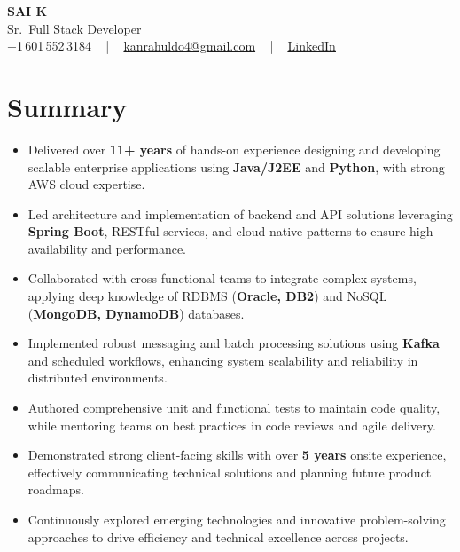 \documentclass[letterpaper,11pt]{article}
\newcommand{\resumeItem}[1]{
  \item\footnotesize{
    {#1 \vspace{-2pt}}
  }
}
\newcommand{\resumeItemListStart}{\begin{itemize}[leftmargin=*]}
\newcommand{\resumeItemListEnd}{\end{itemize}\vspace{-5pt}}
\begin{document}
\begin{center}
    {\fontsize{14pt}{12pt}\selectfont \textbf{\MakeUppercase{Sai K}}}\\ \vspace{2pt}
    \fontsize{10pt}{12pt}\selectfont Sr.\ Full Stack Developer\\ \vspace{2pt}
    \fontsize{10pt}{12pt}\selectfont +1\,601\,552\,3184 ~ | ~
    \href{mailto:kanrahuldo4@gmail.com}{kanrahuldo4@gmail.com} ~ | ~
    \href{https://www.linkedin.com/in/srrrk/}{\color{blue}\underline{LinkedIn}}
    \vspace{-10pt}
\end{center}

\section{Summary}
\fontsize{9pt}{10pt}\selectfont
\resumeItemListStart
  \resumeItem{Delivered over \textbf{11+ years} of hands-on experience designing and developing scalable enterprise applications using \textbf{Java/J2EE} and \textbf{Python}, with strong AWS cloud expertise.}
  \resumeItem{Led architecture and implementation of backend and API solutions leveraging \textbf{Spring Boot}, RESTful services, and cloud-native patterns to ensure high availability and performance.}
  \resumeItem{Collaborated with cross-functional teams to integrate complex systems, applying deep knowledge of RDBMS (\textbf{Oracle, DB2}) and NoSQL (\textbf{MongoDB, DynamoDB}) databases.}
  \resumeItem{Implemented robust messaging and batch processing solutions using \textbf{Kafka} and scheduled workflows, enhancing system scalability and reliability in distributed environments.}
  \resumeItem{Authored comprehensive unit and functional tests to maintain code quality, while mentoring teams on best practices in code reviews and agile delivery.}
  \resumeItem{Demonstrated strong client-facing skills with over \textbf{5 years} onsite experience, effectively communicating technical solutions and planning future product roadmaps.}
  \resumeItem{Continuously explored emerging technologies and innovative problem-solving approaches to drive efficiency and technical excellence across projects.}
\resumeItemListEnd
\vspace{-6pt}

\end{document}
